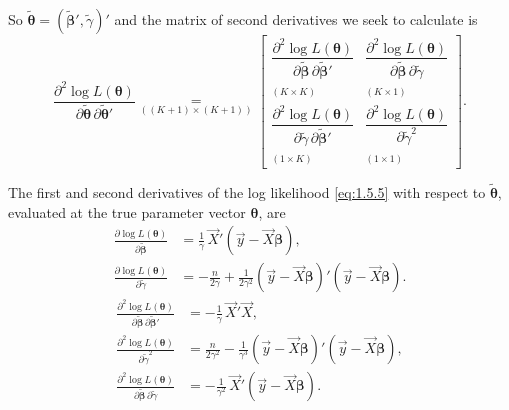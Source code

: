 So $\tilde{\bm{\theta}} = (\widetilde{\bm{\beta}}', \tilde{\gamma})'$ and the matrix of
second derivatives we seek to calculate is
%
\begin{equation}
  \frac{\partial^2 \log L(\bm{\theta})}
       {\partial \tilde{\bm{\theta}}\,\partial \tilde{\bm{\theta}}'}
  \underset{((K+1) \times (K+1))}{=}
  \begin{bmatrix}
    \dfrac{\partial^2 \log L(\bm{\theta})}
          {\partial \widetilde{\bm{\beta}}\,\partial \widetilde{\bm{\beta}}'}
    & \dfrac{\partial^2 \log L(\bm{\theta})}
            {\partial \widetilde{\bm{\beta}}\,\partial \tilde{\gamma}} \\[12pt]
    \underset{(K \times K)}{}
    & \underset{(K \times 1)}{} \\[4pt]
    \dfrac{\partial^2 \log L(\bm{\theta})}
          {\partial \tilde{\gamma}\,\partial \widetilde{\bm{\beta}}'}
    & \dfrac{\partial^2 \log L(\bm{\theta})}
            {\partial \tilde{\gamma}^2} \\[6pt]
    \underset{(1 \times K)}{}
    & \underset{(1 \times 1)}{}
  \end{bmatrix}.
  \label{eq:1.5.12}
\end{equation}

The first and second derivatives of the log likelihood \eqref{eq:1.5.5} with respect to
$\tilde{\bm{\theta}}$, evaluated at the true parameter vector $\bm{\theta}$, are
%
\begin{align}
  \frac{\partial \log L(\bm{\theta})}{\partial \widetilde{\bm{\beta}}}
    &= \frac{1}{\gamma}\,\vec{X}'(\vec{y} - \vec{X}\bm{\beta}),
  \label{eq:1.5.13a} \\[6pt]
  \frac{\partial \log L(\bm{\theta})}{\partial \tilde{\gamma}}
    &= -\frac{n}{2\gamma}
       + \frac{1}{2\gamma^2}
         (\vec{y} - \vec{X}\bm{\beta})'(\vec{y} - \vec{X}\bm{\beta}).
  \label{eq:1.5.13b}
\end{align}
%
\begin{align}
  \frac{\partial^2 \log L(\bm{\theta})}
       {\partial \widetilde{\bm{\beta}}\,\partial \widetilde{\bm{\beta}}'}
    &= -\frac{1}{\gamma}\,\vec{X}'\vec{X},
  \label{eq:1.5.14a} \\[6pt]
  \frac{\partial^2 \log L(\bm{\theta})}{\partial \tilde{\gamma}^2}
    &= \frac{n}{2\gamma^2}
       - \frac{1}{\gamma^3}
         (\vec{y} - \vec{X}\bm{\beta})'(\vec{y} - \vec{X}\bm{\beta}),
  \label{eq:1.5.14b} \\[6pt]
  \frac{\partial^2 \log L(\bm{\theta})}
       {\partial \widetilde{\bm{\beta}}\,\partial \tilde{\gamma}}
    &= -\frac{1}{\gamma^2}\,\vec{X}'(\vec{y} - \vec{X}\bm{\beta}).
  \label{eq:1.5.14c}
\end{align}

